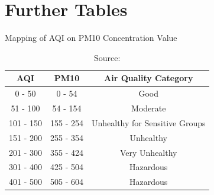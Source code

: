 \documentclass[12pt,a4paper]{article}
\begin{document}
{\vfill
\clearpage
\section{Further Tables}
\begin{table}[h]
 \caption{Mapping of AQI on PM10 Concentration Value} 
 \label{T:A1} 
\center \vspace{-0.5cm}
\begin{tabular}{|c|c|c|}
\hline
AQI & PM10 & Air Quality Category \\\hline
0 - 50 & 0 - 54 & Good \\
51 - 100 & 54 - 154 & Moderate \\
101 - 150 & 155 - 254 & Unhealthy for Sensitive Groups \\
151 - 200 & 255 - 354 & Unhealthy \\
201 - 300 & 355 - 424 & Very Unhealthy \\
301 - 400 & 425 - 504 & Hazardous \\
401 - 500 & 505 - 604 & Hazardous \\
\hline
\end{tabular}
\vspace{0.2cm}\caption*{Source: \citeauthor{EPA}}
\end{table}

}
\end{document}
